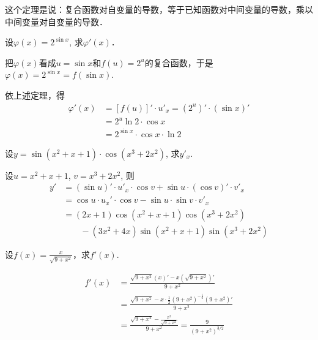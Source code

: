 这个定理是说：复合函数对自变量的导数，等于已知函数对中间变量的导数，乘以中间变量对自变量的导数．


\begin{example}
    设$\varphi (x)=2^{\sin x}$, 求$\varphi'(x)$．
\end{example}

    
\begin{solution}
    把$\varphi (x)$看成$u=\sin x$和$f(u)=2^u$的复合函数，于是$\varphi  (x) =2^{\sin x}=f (\sin x)$.

依上述定理，得
\begin{align*}
  \varphi' (x) &= [f (u) ]'\cdot u'_x= (2^u)'\cdot (\sin x)'\\
&=2^u\ln2 \cdot \cos x\\
&=2^{\sin x}\cdot \cos x \cdot \ln2  
\end{align*}
\end{solution}

\begin{example}
    设$y=\sin(x^2+x+1)\cdot \cos(x^3+2x^2)$, 求$y'_x$.
\end{example}

\begin{solution}
    设$u=x^2+x+1$, $v=x^3+2x^2$, 则
\begin{align*}
  y'&= (\sin u)'\cdot u'_x\cdot \cos v+\sin u\cdot (\cos v)'\cdot v'_x\\
&=\cos u\cdot u_x'\cdot \cos v-\sin u\cdot \sin v\cdot  v'_x\\
&= (2x+1) \cos (x^2+x+1) \cos (x^3+2x^2)\\
&\qquad - (3x^2+4x) \sin (x^2+x+1) \sin (x^3+2x^2)  
\end{align*}
\end{solution}
    
\begin{example}
设$f(x)=\frac{x}{\sqrt{9+x^2}}$，求$f'(x)$.
\end{example}


\begin{solution}
\begin{align*}
    f'(x)&=\frac{\sqrt{9+x^2}(x)'-x\left(\sqrt{9+x^2}\right)'}{9+x^2}\\
    &=\frac{\sqrt{9+x^2}-x\cdot \frac{1}{2}(9+x^2)^{-\tfrac{1}{2}}(9+x^2)'}{9+x^2}\\
    &=\frac{\sqrt{9+x^2}-\frac{x^2}{\sqrt{9+x^2}}}{9+x^2}=\frac{9}{\left(9+x^2\right)^{3/2}}
\end{align*}
\end{solution}
    
